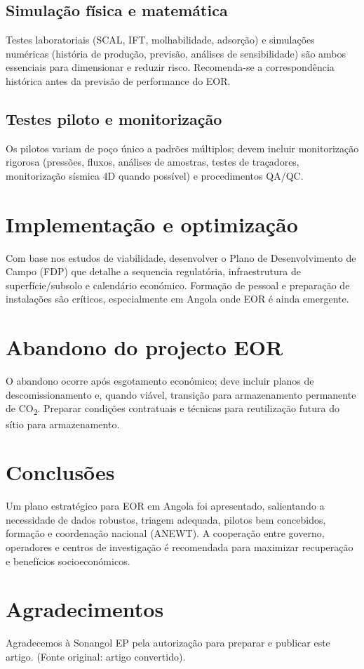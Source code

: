 \documentclass[11pt,a4paper]{article}
\begin{document}
\subsection{Simulação física e matemática}
Testes laboratoriais (SCAL, IFT, molhabilidade, adsorção) e simulações numéricas (história de produção, previsão, análises de sensibilidade) são ambos essenciais para dimensionar e reduzir risco. Recomenda-se a correspondência histórica antes da previsão de performance do EOR.

\subsection{Testes piloto e monitorização}
Os pilotos variam de poço único a padrões múltiplos; devem incluir monitorização rigorosa (pressões, fluxos, análises de amostras, testes de traçadores, monitorização sísmica 4D quando possível) e procedimentos QA/QC.

\section{Implementação e optimização}
Com base nos estudos de viabilidade, desenvolver o Plano de Desenvolvimento de Campo (FDP) que detalhe a sequencia regulatória, infraestrutura de superfície/subsolo e calendário económico. Formação de pessoal e preparação de instalações são críticos, especialmente em Angola onde EOR é ainda emergente.

\section{Abandono do projecto EOR}
O abandono ocorre após esgotamento económico; deve incluir planos de descomissionamento e, quando viável, transição para armazenamento permanente de CO\textsubscript{2}. Preparar condições contratuais e técnicas para reutilização futura do sítio para armazenamento.

\section{Conclusões}
Um plano estratégico para EOR em Angola foi apresentado, salientando a necessidade de dados robustos, triagem adequada, pilotos bem concebidos, formação e coordenação nacional (ANEWT). A cooperação entre governo, operadores e centros de investigação é recomendada para maximizar recuperação e benefícios socioeconómicos.

\section*{Agradecimentos}
Agradecemos à Sonangol EP pela autorização para preparar e publicar este artigo. (Fonte original: artigo convertido).
\end{document}
